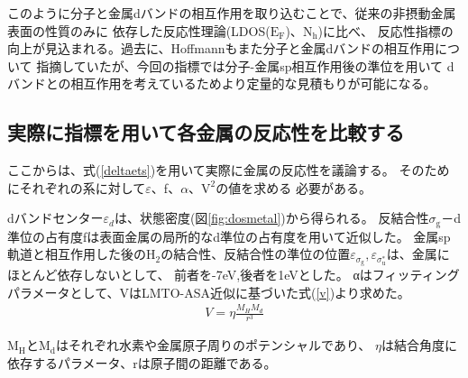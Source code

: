 \documentclass[12pt]{ltjsarticle}
\begin{document}
このように分子と金属dバンドの相互作用を取り込むことで、従来の非摂動金属表面の性質のみに
依存した反応性理論(LDOS($\text{E}_\text{F}$)、$\text{N}_\text{h}$)に比べ、
反応性指標の向上が見込まれる。過去に、Hoffmannもまた分子と金属dバンドの相互作用について
指摘していた\cite{Hoffman1988}が、今回の指標では分子-金属sp相互作用後の準位を用いて
dバンドとの相互作用を考えているためより定量的な見積もりが可能になる。

\subsection{実際に指標を用いて各金属の反応性を比較する}
ここからは、式(\ref{deltaets})を用いて実際に金属の反応性を議論する。
そのためにそれぞれの系に対して$\varepsilon$、f、$\alpha$、$\text{V}^\text{2}$の値を求める
必要がある。

dバンドセンター$\varepsilon_d$は、状態密度(図\ref{fig:dosmetal})から得られる。
反結合性$\sigma_\text{g}$－d準位の占有度fは表面金属の局所的なd準位の占有度を用いて近似した。
金属sp軌道と相互作用した後の$\text{H}_\text{2}$の結合性、反結合性の準位の位置$\varepsilon _
{\sigma_\text{g}},\varepsilon _{\sigma_\text{u}^*}$は、金属にほとんど依存しないとして、
前者を-7eV,後者を1eVとした。
αはフィッティングパラメータとして、VはLMTO-ASA近似に基づいた式(\ref{v})より求めた。
\cite{Norskov1989}
\begin{eqnarray}
    \label{v}
    V = \eta \frac{ M_H M_d }{r^3}
\end{eqnarray}

$\text{M}_\text{H}$と$\text{M}_\text{d}$はそれぞれ水素や金属原子周りのポテンシャルであり、
$\eta$は結合角度に依存するパラメータ、rは原子間の距離である。
\end{document}
